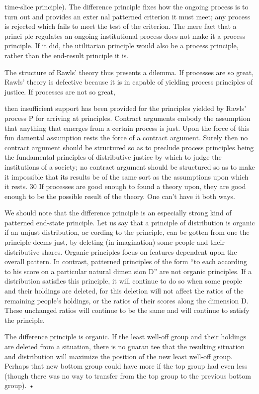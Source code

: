 \documentclass[11pt,openany]{book}
\begin{document}
time-slice principle). The difference principle fixes how the ongoing process is to turn out and provides an exter nal patterned criterion it must meet; any process is rejected which fails to meet the test of the criterion. The mere fact that a princi ple regulates an ongoing institutional process does not make it a process principle. If it did, the utilitarian principle would also be a process principle, rather than the end-result principle it is. 

The structure of Rawls' theory thus presents a dilemma. If processes are so great, Rawls' theory is defective because it is in capable of yielding process principles of justice. If processes are not so great, 

then insufficient support has been provided for the principles yielded by Rawls' process P for arriving at principles. Contract arguments embody the assumption that anything that emerges from a certain process is just. Upon the force of this fun damental assumption rests the force of a contract argument. Surely then no contract argument should be structured so as to preclude process principles being the fundamental principles of distributive justice by which to judge the institutions of a society; no contract argument should be structured so as to make it impossible that its results be of the same sort as the assumptions upon which it rests. 30 If processes are good enough to found a theory upon, they are good enough to be the possible result of the theory. One can't have it both ways. 

We should note that the difference principle is an especially strong kind of patterned end-state principle. Let us say that a principle of distribution is organic if an unjust distribution, ac cording to the principle, can be gotten from one the principle deems just, by deleting (in imagination) some people and their distributive shares. Organic principles focus on features dependent upon the overall pattern. In contrast, patterned principles of the form ``to each according to his score on a particular natural dimen sion D'' are not organic principles. If a distribution satisfies this principle, it will continue to do so when some people and their holdings are deleted, for this deletion will not affect the ratios of the remaining people's holdings, or the ratios of their scores along the dimension D. These unchanged ratios will continue to be the same and will continue to satisfy the principle. 

The difference principle is organic. If the least well-off group and their holdings are deleted from a situation, there is no guaran tee that the resulting situation and distribution will maximize the position of the new least well-off group. Perhaps that new bottom group could have more if the top group had even less (though there was no way to transfer from the top group to the previous bottom group). • 
\end{document}

